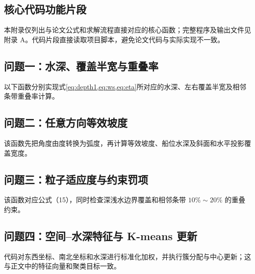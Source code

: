 \documentclass[withoutpreface,notoc]{cumcmthesis}
\begin{document}
\begin{appendices}
\section{核心代码功能片段}
本附录仅列出与论文公式和求解流程直接对应的核心函数；完整程序及输出文件见附录 A。代码片段直接读取项目脚本，避免论文代码与实际实现不一致。

\subsection{问题一：水深、覆盖半宽与重叠率}
以下函数分别实现式\cref{eq:depth1,eq:ws,eq:eta}所对应的水深、左右覆盖半宽及相邻条带重叠率计算。



\subsection{问题二：任意方向等效坡度}
该函数先把角度由度转换为弧度，再计算等效坡度、船位水深及斜面和水平投影覆盖宽度。


\subsection{问题三：粒子适应度与约束罚项}
该函数对应公式（15），同时检查深浅水边界覆盖和相邻条带 $10\%\sim20\%$ 的重叠约束。


\subsection{问题四：空间--水深特征与 K-means 更新}
代码对东西坐标、南北坐标和水深进行标准化加权，并执行簇分配与中心更新；这与正文中的特征向量和聚类目标一致。

\end{appendices}
\end{document}
